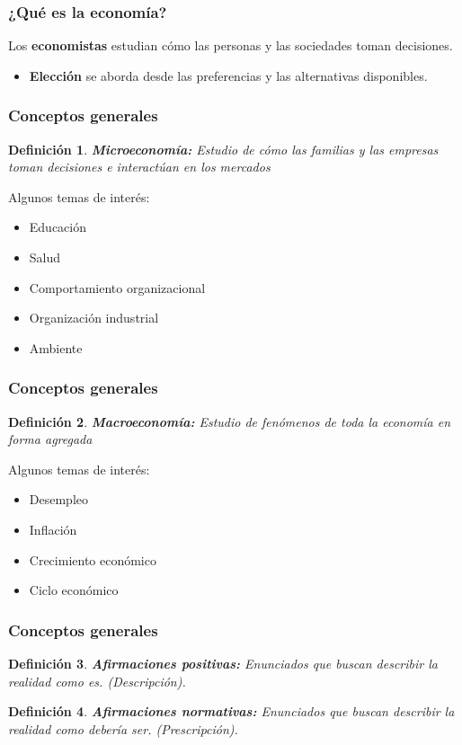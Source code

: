 \documentclass[dvipsnames,table]{beamer}
\newtheorem{mydef}{Definición}
\begin{document}
		\begin{frame}
			\frametitle{¿Qué es la economía?}
			Los \textbf{economistas} estudian cómo las personas y las sociedades toman decisiones.
			\begin{itemize}
				\item \textbf{Elección} se aborda desde las preferencias y las alternativas disponibles.
			\end{itemize}
		\end{frame}

		\begin{frame}
			\frametitle{Conceptos generales}
			\begin{mydef}
				\textbf{Microeconomía:} Estudio de cómo las familias y las empresas toman decisiones e interactúan en los mercados
			\end{mydef}
			\vspace{.5cm}
			Algunos temas de interés:
			\begin{itemize}
				\item Educación
				\item Salud
				\item Comportamiento organizacional
				\item Organización industrial
				\item Ambiente
			\end{itemize}
		\end{frame}

		\begin{frame}
			\frametitle{Conceptos generales}
			\begin{mydef}
				\textbf{Macroeconomía:} Estudio de fenómenos de toda la economía en forma agregada
			\end{mydef}
			\vspace{.5cm}
			Algunos temas de interés:
			\begin{itemize}
				\item Desempleo
				\item Inflación
				\item Crecimiento económico
				\item Ciclo económico
			\end{itemize}
		\end{frame}

		\begin{frame}
			\frametitle{Conceptos generales}
			\begin{mydef}
				\textbf{Afirmaciones positivas:} Enunciados que buscan describir la realidad como es. (Descripción).
			\end{mydef}
			\begin{mydef}
				\textbf{Afirmaciones normativas:} Enunciados que buscan describir la realidad como debería ser. (Prescripción).
			\end{mydef}
		\end{frame}
\end{document}
